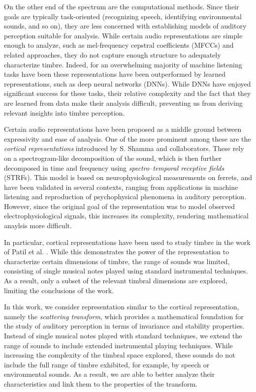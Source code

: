\documentclass[10pt,letterpaper]{article}
\begin{document}
On the other end of the spectrum are the computational methods.
Since their goals are typically task-oriented (recognizing speech, identifying environmental sounds, and so on), they are less concerned with establishing models of auditory perception suitable for analysis.
While certain audio representations are simple enough to analyze, such as mel-frequency cepstral coefficients (MFCCs) and related approaches, they do not capture enough structure to adequately characterize timbre.
Indeed, for an overwhelming majority of machine listening tasks have been these representations have been outperformed by learned representations, such as deep neural networks (DNNs).
While DNNs have enjoyed significant success for these tasks, their relative complexity and the fact that they are learned from data make their analysis difficult, preventing us from deriving relevant insights into timbre perception.

Certain audio representations have been proposed as a middle ground between expressivity and ease of analysis.
One of the more prominent among these are the \emph{cortical representations} introduced by S. Shamma and collaborators.
These rely on a spectrogram-like decomposition of the sound, which is then further decomposed in time and frequency using \emph{spectro--temporal receptive fields} (STRFs).
This model is based on neurophysiological measurements on ferrets, and have been validated in several contexts, ranging from applications in machine listening and reproduction of psychophysical phenomena in auditory perception.
However, since the original goal of the representation was to model observed electrophysiological signals, this increases its complexity, rendering mathematical anaylsis more difficult.

In particular, cortical representations have been used to study timbre in the work of Patil et al. \cite{patil2012music}.
While this demonstrates the power of the representation to characterize certain dimensions of timbre, the range of sounds was limited, consisting of single musical notes played using standard instrumental techniques.
As a result, only a subset of the relevant timbral dimensions are explored, limiting the conclusions of the work.

In this work, we consider representation similar to the cortical representation, namely the \emph{scattering transform}, which provides a mathematical foundation for the study of auditory perception in terms of invariance and stability properties.
Instead of single musical notes played with standard techniques, we extend the range of sounds to include extended instrumental playing techniques.
While increasing the complexity of the timbral space explored, these sounds do not include the full range of timbre exhibited, for example, by speech or environmental sounds.
As a result, we are able to better analyze their characteristics and link them to the properties of the transform.
\end{document}
